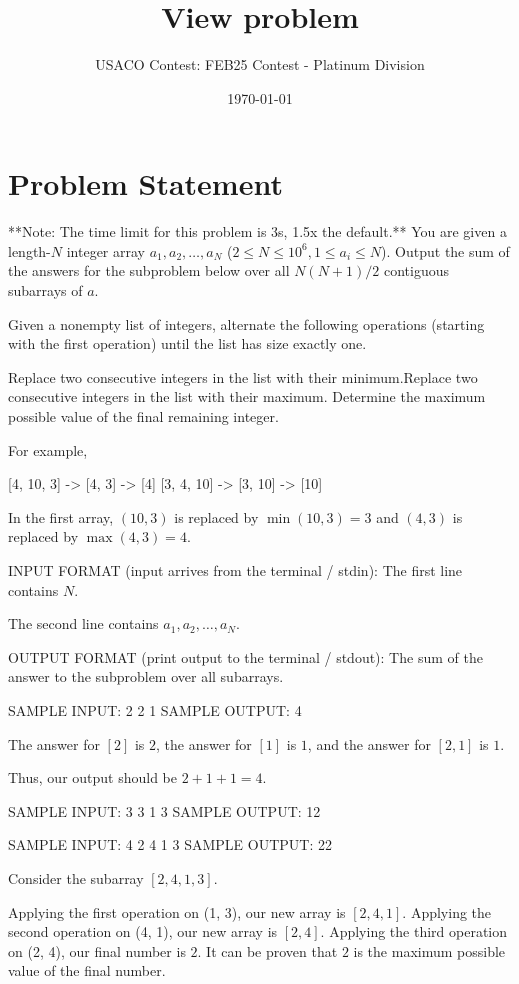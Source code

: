 \documentclass[12pt]{article}
\title{View problem}
\author{USACO Contest: FEB25 Contest - Platinum Division}
\date{\today}
\begin{document}
\maketitle

\section*{Problem Statement}


**Note: The time limit for this problem is 3s, 1.5x the default.**
You are given a length-$N$ integer array $a_1,a_2,\dots,a_N$
($2\le N\le 10^6, 1\le a_i\le N$). Output the sum of the answers for the
subproblem below over all $N(N+1)/2$ contiguous subarrays of $a$.

Given a nonempty list of integers, alternate the following operations (starting
with the first operation) until the list has size exactly one.

Replace two consecutive integers in the list with their minimum.Replace two consecutive integers in the list with their maximum.
Determine the maximum possible value of the final remaining integer.

For example,


[4, 10, 3] -> [4, 3] -> [4]
[3, 4, 10] -> [3, 10] -> [10]

In the first array, $(10, 3)$ is replaced by $\min(10, 3)=3$ and $(4, 3)$ is
replaced by $\max(4, 3)=4$.

INPUT FORMAT (input arrives from the terminal / stdin):
The first line contains $N$.

The second line contains $a_1,a_2,\dots,a_N$.

OUTPUT FORMAT (print output to the terminal / stdout):
The sum of the answer to the subproblem over all subarrays.

SAMPLE INPUT:
2
2 1
SAMPLE OUTPUT: 
4

The answer for $[2]$ is $2$, the answer for $[1]$ is $1$, and the answer for
$[2, 1]$ is $1$. 

Thus, our output should be $2+1+1 = 4$. 

SAMPLE INPUT:
3
3 1 3
SAMPLE OUTPUT: 
12

SAMPLE INPUT:
4
2 4 1 3
SAMPLE OUTPUT: 
22

Consider the subarray $[2, 4, 1, 3]$. 

 Applying the first operation on (1, 3), our new array is $[2, 4, 1]$.  Applying the second operation on (4, 1), our new array is $[2, 4]$.  Applying the third operation on (2, 4), our final number is $2$. 
It can be proven that $2$ is the maximum possible value of the final number. 
\end{document}

